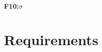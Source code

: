 \documentclass{article}
\begin{document}
\begin{titlepage}
    \begin{center}
        \large\textbf{F10:$\sigma$}
    \end{center}
    
\section*{Requirements}












\end{titlepage}
\end{document}
